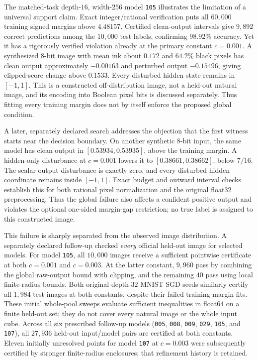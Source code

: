 The matched-task depth-$16$, width-$256$ model \texttt{105} illustrates
the limitation of a universal support claim. Exact integer/rational
verification puts all $60{,}000$ training signed margins above $4.48157$.
Certified clean-output intervals give $9{,}892$ correct predictions among
the $10{,}000$ test labels, confirming $98.92\%$ accuracy. Yet it has a rigorously
verified violation already at the primary constant
$c=0.001$. A synthesized 8-bit image with mean ink about $0.172$ and
$64.2\%$ black pixels has clean output approximately $-0.00163$ and
perturbed output $-0.15496$, giving clipped-score change above $0.1533$.
Every disturbed hidden state remains in $[-1,1]$. This is a constructed
off-distribution image, not a held-out natural image, and its encoding
into Boolean pixel bits is discussed separately. Thus fitting every
training margin does not by itself enforce the proposed global
condition.

A later, separately declared search addresses the objection that the
first witness starts near the decision boundary. On another synthetic
8-bit input, the same model has clean output in
$[0.53934,0.53935]$, above the training margin. A hidden-only disturbance
at $c=0.001$ lowers it to $[0.38661,0.38662]$, below $7/16$.
The scalar output disturbance is exactly zero, and every disturbed
hidden coordinate remains inside $[-1,1]$. Exact budget and outward
interval checks establish this for both rational pixel normalization
and the original float32 preprocessing. Thus the global failure also
affects a confident positive output and violates the optional
one-sided margin-gap restriction; no true label is assigned to this
constructed image.

This failure is sharply separated from the observed image distribution.
A separately declared follow-up checked \emph{every} official held-out
image for selected models. For model \texttt{105}, all $10{,}000$ images
receive a sufficient pointwise certificate at both $c=0.001$ and
$c=0.003$. At the latter constant, $9{,}960$ pass by combining the global
raw-output bound with clipping, and the remaining $40$ pass using local
finite-radius bounds. Both original depth-$32$ MNIST SGD seeds similarly
certify all $1{,}984$ test images at both constants, despite their failed
training-margin fits. These initial whole-pool sweeps evaluate sufficient
inequalities in float64 on a finite held-out set; they do not cover every
natural image or the whole input cube.
Across all six prescribed follow-up models
(\texttt{005}, \texttt{008}, \texttt{009}, \texttt{029}, \texttt{105}, and
\texttt{107}), all $27{,}936$ held-out input/model pairs are certified
at both constants. Eleven initially unresolved points for model
\texttt{107} at $c=0.003$ were subsequently certified by stronger
finite-radius enclosures; that refinement history is retained.

